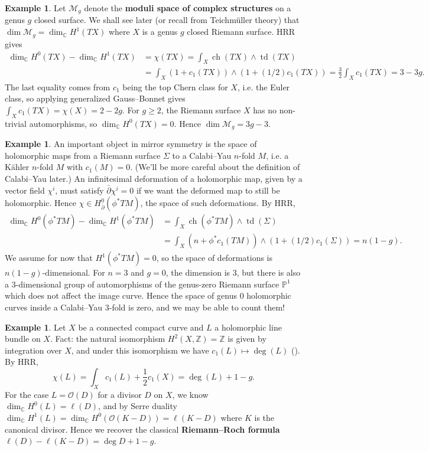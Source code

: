 \documentclass{report}
\theoremstyle{plain}
\theoremstyle{definition}
\newtheorem{example}[theorem]{Example}
\theoremstyle{remark}
\newcommand{\di}{\partial}
\newcommand{\bC}{\mathbb{C}}
\newcommand{\bP}{\mathbb{P}}
\newcommand{\bZ}{\mathbb{Z}}
\newcommand{\cM}{\mathcal{M}}
\newcommand{\cO}{\mathcal{O}}
\DeclareMathOperator{\ch}{ch}
\DeclareMathOperator{\td}{td}
\newcommand{\bdi}{\bar{\di}}
\begin{document}
\begin{example}
  Let $\cM_g$ denote the {\bf moduli space of complex structures} on a
  genus $g$ closed surface. We shall see later (or recall from
  Teichm\"uller theory) that $\dim \cM_g = \dim_{\bC} H^1(TX)$ where
  $X$ is a genus $g$ closed Riemann surface. HRR gives
  \begin{align*}
    \dim_{\bC} H^0(TX) - \dim_{\bC} H^1(TX)
    &= \chi(TX) = \int_X \ch(TX) \wedge \td(TX) \\
    &= \int_X (1 + c_1(TX)) \wedge (1 + (1/2)c_1(TX))
    = \frac{3}{2} \int_X c_1(TX) = 3 - 3g.
  \end{align*}
  The last equality comes from $c_1$ being the top Chern class for
  $X$, i.e. the Euler class, so applying generalized Gauss--Bonnet
  gives $\int_X c_1(TX) = \chi(X) = 2 - 2g$. For $g \ge 2$, the
  Riemann surface $X$ has no non-trivial automorphisms, so $\dim_{\bC}
  H^0(TX) = 0$. Hence $\dim \cM_g = 3g - 3$.
\end{example}

\begin{example}
  An important object in mirror symmetry is the space of holomorphic
  maps from a Riemann surface $\Sigma$ to a Calabi--Yau $n$-fold $M$,
  i.e. a K\"ahler $n$-fold $M$ with $c_1(M) = 0$. (We'll be more
  careful about the definition of Calabi--Yau later.) An infinitesimal
  deformation of a holomorphic map, given by a vector field $\chi^i$,
  must satisfy $\bdi \chi^i = 0$ if we want the deformed map to still
  be holomorphic. Hence $\chi \in H^0_{\bdi}(\phi^* TM)$, the space of
  such deformations. By HRR,
  \begin{align*}
    \dim_{\bC} H^0(\phi^*TM) - \dim_{\bC} H^1(\phi^*TM)
    &= \int_X \ch(\phi^*TM) \wedge \td(\Sigma) \\
    &= \int_X (n + \phi^*c_1(TM)) \wedge (1 + (1/2)c_1(\Sigma)) = n(1-g).
  \end{align*}
  We assume for now that $H^1(\phi^* TM) = 0$, so the space of
  deformations is $n(1-g)$-dimensional. For $n = 3$ and $g = 0$, the
  dimension is $3$, but there is also a $3$-dimensional group of
  automorphisms of the genus-zero Riemann surface $\bP^1$ which does
  not affect the image curve. Hence the space of genus $0$ holomorphic
  curves inside a Calabi--Yau $3$-fold is zero, and we may be able to
  count them!
\end{example}

\begin{example}
  Let $X$ be a connected compact curve and $L$ a holomorphic line
  bundle on $X$. Fact: the natural isomorphism $H^2(X, \bZ) = \bZ$ is
  given by integration over $X$, and under this isomorphism we have
  $c_1(L) \mapsto \deg(L)$ (\cite[Exercise 4.4.1]{Huybrechts2005}). By
  HRR,
  \[ \chi(L) = \int_X c_1(L) + \frac{1}{2} c_1(X) = \deg(L) + 1 - g. \]
  For the case $L = \cO(D)$ for a divisor $D$ on $X$, we know
  $\dim_{\bC} H^0(L) = \ell(D)$, and by Serre duality $\dim_{\bC}
  H^1(L) = \dim_{\bC} H^0(\cO(K - D)) = \ell(K - D)$ where $K$ is the
  canonical divisor. Hence we recover the classical {\bf Riemann--Roch
    formula} $\ell(D) - \ell(K-D) = \deg D + 1 - g$.
\end{example}
\end{document}
